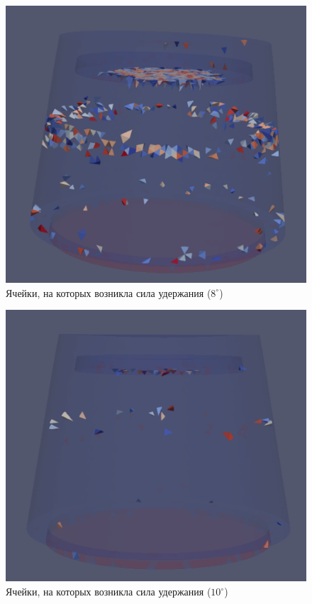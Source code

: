 \documentclass[a4paper, 14pt]{extreport}
\begin{document}
\begin{figure}[H]
	\center
	\includegraphics[scale=0.6]{pictures_diploma/push4-8deg.png}
	\caption{Ячейки, на которых возникла сила удержания ($8^{\circ}$)}
	\label{fig: push4-8deg}
\end{figure}

\begin{figure}[H]
	\center
	\includegraphics[scale=0.6]{pictures_diploma/push4-10deg.png}
	\caption{Ячейки, на которых возникла сила удержания ($10^{\circ}$)}
	\label{fig: push4-10deg}
\end{figure}
\end{document}
